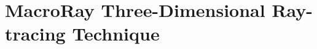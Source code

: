 \chapter{MacroRay Three-Dimensional Ray-tracing Technique}{
  \label{ch:MacroRay Three-Dimensional Ray-tracing Technique}
  \blindtext[16]


  \printbibliography
}